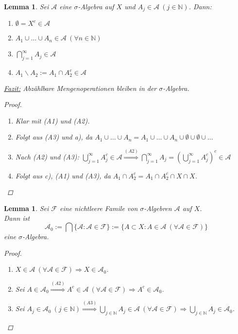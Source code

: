 \documentclass[a4paper]{scrreprt}
\newcommand{\N}{\mathbb{N}}
\newcommand{\jlabel}[1]{\label{j_#1}}
\theoremstyle{plain}
\newtheorem{lem}[thm]{Lemma}
\theoremstyle{definition}
\begin{document}
\begin{lem}
\jlabel{Lem 1.3}
    Sei $\mathcal{A}$ eine $\sigma$-Algebra auf $X$ und $A_j \in \mathcal{A} \ (j \in \N)$. Dann:
    \begin{enumerate}
        \item $\emptyset = X^c \in \mathcal{A}$
        \item $A_1 \cup \dots \cup A_n \in \mathcal{A} \ (\forall n \in \N)$
        \item $\bigcap_{j=1}^\infty A_j \in \mathcal{A}$
        \item $A_1 \backslash A_2 := A_1 \cap A_2^c \in \mathcal{A}$
    \end{enumerate}
    \uline{Fazit:} Abzählbare Mengenoperationen bleiben in der $\sigma$-Algebra.
    \begin{proof}
        \begin{enumerate}
            \item Klar mit (A1) und (A2).
            \item Folgt aus (A3) und a), da $A_1 \cup \dots \cup A_n = A_1 \cup \dots \cup A_n \cup \emptyset \cup \emptyset \cup \dots$
            \item Nach (A2) und (A3): $\bigcup_{j=1}^\infty A_j^c \in \mathcal{A} \overset{(A2)}{\Rightarrow} \bigcap_{j=1}^\infty A_j = \left( \bigcup_{j=1}^\infty A_j^c \right)^c \in \mathcal{A}$
            \item Folgt aus c), (A1) und (A3), da $A_1 \cap A_2^c = A_1 \cap A_2^c \cap X \cap X$.
        \end{enumerate}

    \end{proof}
\end{lem}

\begin{lem}
\jlabel{Lem 1.4}
    Sei $\mathcal{F}$ eine nichtleere Famile von $\sigma$-Algebren $\mathcal{A}$ auf $X$.\\
    Dann ist 
    \begin{displaymath}
        \mathcal{A}_0 := \bigcap \{\mathcal{A} : \mathcal{A} \in \mathcal{F}\} := \{A \subset X: A \in \mathcal{A} \ (\forall \mathcal{A} \in \mathcal{F})\}
    \end{displaymath}
    eine $\sigma$-Algebra.
    \begin{proof}
        \begin{enumerate}
            \item[(A1)] $X \in \mathcal{A} \ (\forall \mathcal{A} \in \mathcal{F}) \Rightarrow X \in \mathcal{A}_0$.
            \item[(A2)] Sei $A \in \mathcal{A}_0 \overset{(A2)}{\Rightarrow} A^c \in \mathcal{A} \ (\forall \mathcal{A} \in \mathcal{F}) \Rightarrow A^c \in \mathcal{A}_0$.
            \item[(A3)] Sei $ A_j \in \mathcal{A}_0 \ (j\in\N) \overset{(A3)}{\Rightarrow} \bigcup_{j\in\N} A_j \in \mathcal{A} \ (\forall \mathcal{A} \in \mathcal{F}) \Rightarrow \bigcup_{j\in\N} A_j \in \mathcal{A}_0$.
        \end{enumerate}
    \end{proof}
\end{lem}
\end{document}
